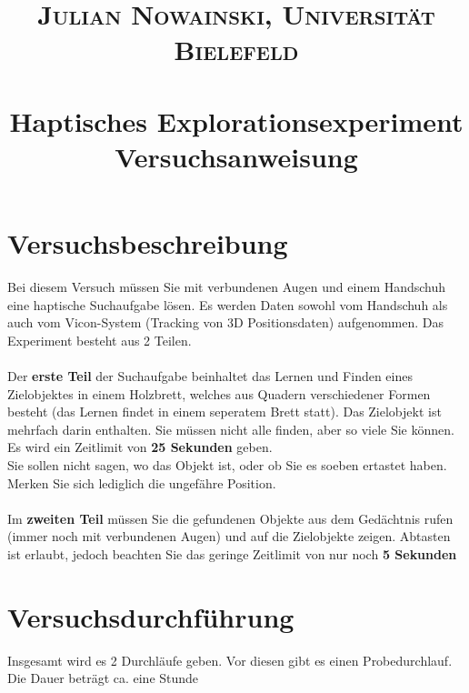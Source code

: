 \documentclass[paper=a4, fontsize=11pt]{scrartcl} %
\title{	
\normalfont \normalsize 
\textsc{Julian Nowainski, Universität Bielefeld} \\ [5pt] %
\horrule{0.5pt} \\[0.4cm] %
\huge Haptisches Explorationsexperiment \\ %
\large Versuchsanweisung
\horrule{2pt} \\[0.5cm] %
\date{\vspace{-10ex}} %
}
\numberwithin{equation}{section} %
\numberwithin{figure}{section} %
\numberwithin{table}{section} %
\begin{document}
\maketitle %


\section{Versuchsbeschreibung}
Bei diesem Versuch müssen Sie mit verbundenen Augen und einem Handschuh eine haptische Suchaufgabe lösen. Es werden Daten sowohl vom Handschuh als auch vom Vicon-System (Tracking von 3D Positionsdaten) aufgenommen. Das Experiment besteht aus 2 Teilen. \\\\
Der \textbf{erste Teil} der Suchaufgabe beinhaltet das Lernen und Finden eines Zielobjektes in einem Holzbrett, welches aus Quadern verschiedener Formen besteht (das Lernen findet in einem seperatem Brett statt). Das Zielobjekt ist mehrfach darin enthalten. Sie müssen nicht alle finden, aber so viele Sie können. Es wird ein Zeitlimit von \textbf{25 Sekunden} geben. \\
Sie sollen nicht sagen, wo das Objekt ist, oder ob Sie es soeben ertastet haben. Merken Sie sich lediglich die ungefähre Position.\\\\
Im \textbf{zweiten Teil} müssen Sie die gefundenen Objekte aus dem Gedächtnis rufen (immer noch mit verbundenen Augen) und auf die Zielobjekte zeigen. Abtasten ist erlaubt, jedoch beachten Sie das geringe Zeitlimit von nur noch \textbf{5 Sekunden}



\section{Versuchsdurchführung}
Insgesamt wird es 2 Durchläufe geben. Vor diesen gibt es einen Probedurchlauf. Die Dauer beträgt ca. eine Stunde
\end{document}
